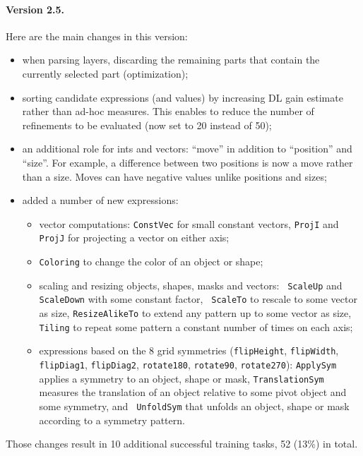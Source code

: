 \documentclass[a4paper]{llncs}
\begin{document}
\paragraph{Version 2.5.} Here are the main changes in this version:
\begin{itemize}
\item when parsing layers, discarding the remaining parts that contain
  the currently selected part (optimization);
\item sorting candidate expressions (and values) by increasing DL gain
  estimate rather than ad-hoc measures. This enables to reduce the
  number of refinements to be evaluated (now set to 20 instead of 50);
\item an additional role for ints and vectors: ``move'' in addition to
  ``position'' and ``size''. For example, a difference between two
  positions is now a move rather than a size. Moves can have negative
  values unlike positions and sizes;
\item added a number of new expressions:
  \begin{itemize}
  \item vector computations: {\tt ConstVec} for small constant
    vectors, {\tt ProjI} and {\tt ProjJ} for projecting a vector on
    either axis;
  \item {\tt Coloring} to change the color of an object or shape;
  \item scaling and resizing objects, shapes, masks and vectors: {\tt
      ScaleUp} and {\tt ScaleDown} with some constant factor, {\tt
      ScaleTo} to rescale to some vector as size, {\tt ResizeAlikeTo}
    to extend any pattern up to some vector as size, {\tt Tiling} to
    repeat some pattern a constant number of times on each axis;
  \item expressions based on the 8 grid symmetries ({\tt flipHeight},
    {\tt flipWidth}, {\tt flipDiag1}, {\tt flipDiag2}, {\tt rotate180}, {\tt rotate90}, {\tt rotate270}):
    {\tt ApplySym} applies a symmetry to an object, shape or mask,
    {\tt TranslationSym} measures the translation of an object
    relative to some pivot object and some symmetry, and {\tt
      UnfoldSym} that unfolds an object, shape or mask according to a
    symmetry pattern.
  \end{itemize}
\end{itemize}
Those changes result in 10 additional successful training tasks, 52
(13\%) in total.
\end{document}
